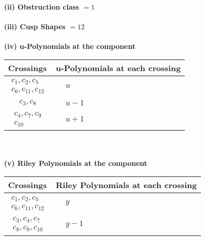 \documentclass[1p]{elsarticle_modified}
\theoremstyle{definition}
\begin{document}
\flushleft \textbf{(ii) Obstruction class $= 1$}\\~\\
\flushleft \textbf{(iii) Cusp Shapes $= 12$}\\~\\
\newpage\renewcommand{\arraystretch}{1}
\flushleft \textbf{(iv) u-Polynomials at the component}\newline \\
\begin{tabular}{m{50pt}|m{274pt}}
Crossings & \hspace{64pt}u-Polynomials at each crossing \\
\hline $$\begin{aligned}c_{1},c_{2},c_{5}\\c_{6},c_{11},c_{12}\end{aligned}$$&$\begin{aligned}
&u
\end{aligned}$\\
\hline $$\begin{aligned}c_{3},c_{8}\end{aligned}$$&$\begin{aligned}
&u-1
\end{aligned}$\\
\hline $$\begin{aligned}c_{4},c_{7},c_{9}\\c_{10}\end{aligned}$$&$\begin{aligned}
&u+1
\end{aligned}$\\
\hline
\end{tabular}\\~\\
\newpage\renewcommand{\arraystretch}{1}
\flushleft \textbf{(v) Riley Polynomials at the component}\newline \\
\begin{tabular}{m{50pt}|m{274pt}}
Crossings & \hspace{64pt}Riley Polynomials at each crossing \\
\hline $$\begin{aligned}c_{1},c_{2},c_{5}\\c_{6},c_{11},c_{12}\end{aligned}$$&$\begin{aligned}
&y
\end{aligned}$\\
\hline $$\begin{aligned}c_{3},c_{4},c_{7}\\c_{8},c_{9},c_{10}\end{aligned}$$&$\begin{aligned}
&y-1
\end{aligned}$\\
\hline
\end{tabular}\\~\\
\end{document}
